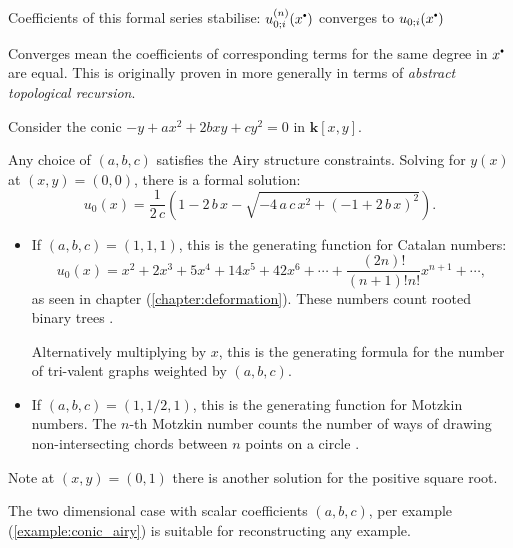     \begin{prop}
    Coefficients of this formal series stabilise: \( u^{(n)}_{0;i}(x^{\sbt}) \) converges to \( u_{0;i}(x^{\sbt}) \)
    \end{prop}
    
    Converges mean the coefficients of corresponding terms for the same degree in \(x^{\sbt}\) are equal. This is originally proven in \cite{ks_airy} more generally in terms of \emph{abstract topological recursion}. 
     
    
    

    
    \begin{ex}
    \label{example:conic_airy}
    Consider the conic \(-y + a x^2 + 2 b x y + c y^2 = 0\) in \( \mathbf{k}[ x,y]\). 
    
    Any choice of \( (a,b,c) \) satisfies the Airy structure constraints. Solving for \(y(x)\) at \( (x,y)=(0,0)\), there is a formal solution:
    \[ u_0(x) = \frac{1}{2\, c } \left( 1 -  2\,b \,x - \sqrt{-4\, a\, c\, x^2 + (-1+2 \,b\,x)^2} \right) .\]
    \begin{itemize}
        \item If \( (a,b,c) = (1,1,1)\), this is the generating function for Catalan numbers: 
        \[ u_0(x) = x^2 + 2 x^3 + 5 x^4 + 14 x^5 + 42 x^6 + \cdots + \frac{(2n)!}{(n+1)!n!} x^{n+1}  + \cdots, \]
        as seen in chapter (\ref{chapter:deformation}).
        These numbers count rooted binary trees \cite{catalan}. 
        
        Alternatively multiplying by \(x\), this is the generating formula for the number of tri-valent graphs weighted by  \((a,b,c)\).
        
        \item If \( (a,b,c) = (1,1/2,1)\), this is the generating function for Motzkin numbers. The \(n\)-th Motzkin number counts the number of ways of drawing non-intersecting chords between \(n\) points on a circle
        \cite{motzkin}.
    \end{itemize}
    Note at \((x,y)=(0,1)\) there is another solution for the positive square root.
    \end{ex}


    The two dimensional case with scalar coefficients \((a,b,c)\), per example (\ref{example:conic_airy}) is suitable for reconstructing any example.

    

